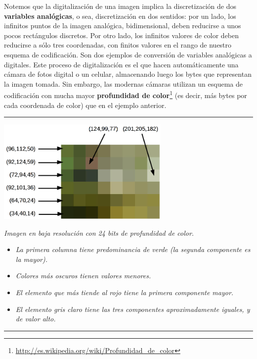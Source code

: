 \documentclass[a4paper]{article}
\newcommand\liststyleLiii{%
\renewcommand\labelitemi{{\textbullet}}
\renewcommand\labelitemii{${\circ}$}
\renewcommand\labelitemiii{${\blacksquare}$}
\renewcommand\labelitemiv{{\textbullet}}
}
\begin{document}
Notemos que la digitalización de una imagen implica la
discretización de dos \textbf{variables analógicas}, o sea,
discretización en dos sentidos: por un lado, los infinitos puntos de
la imagen analógica, bidimensional, deben reducirse a unos pocos
rectángulos discretos. Por otro lado, los infinitos valores de color
deben reducirse a sólo tres coordenadas, con finitos valores en el
rango de nuestro esquema de codificación. Son dos ejemplos de
conversión de variables analógicas a digitales. Este proceso de
digitalización es el que hacen automáticamente una cámara de
fotos digital o un celular, almacenando luego los bytes que representan
la imagen tomada. Sin embargo, las modernas cámaras utilizan un
esquema de codificación con mucha mayor \textbf{profundidad de
color}\footnote{\url{http://es.wikipedia.org/wiki/Profundidad_de_color}}
(es decir, más bytes por cada coordenada de color) que en el ejemplo
anterior.


\bigskip



\begin{center}
\rule{\textwidth}{0.005in}
\begin{minipage}{17.006cm}
{\centering

\includegraphics[width=8.375cm,height=5.048cm]{IC2020Codificacion20de20datos-img2.png}
 
\par}


\bigskip

{\centering\itshape
Imagen en baja resolución con 24 bits de profundidad de color.
\par}

\liststyleLiii
\begin{itemize}
\clearpage\item {\itshape
La primera columna tiene predominancia de verde (la segunda componente
es la mayor).}
\item {\itshape
Colores más oscuros tienen valores menores.}
\item {\itshape
El elemento que más tiende al rojo tiene la primera componente mayor.}
\item {\itshape
El elemento gris claro tiene las tres componentes aproximadamente
iguales, y de valor alto.}
\end{itemize}
\end{minipage}
\rule{\textwidth}{0.005in}
\end{center}
\clearpage
\end{document}
